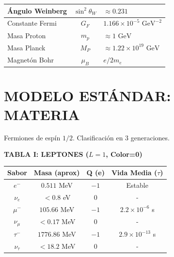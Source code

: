 \begin{center}
\begin{tabular}{|l|c|l|}
            Ángulo Weinberg      & $\sin^2\theta_W$     & $\approx 0.231$                           \\ \hline
            Constante Fermi      & $G_F$                & $1.166 \times 10^{-5} \text{ GeV}^{-2}$   \\ \hline
            Masa Proton          & $m_p$                & $\approx 1                   \text{ GeV}$ \\ \hline
            Masa Planck          & $M_P$                & $\approx 1.22 \times 10^{19} \text{ GeV}$ \\ \hline
            Magnetón Bohr        & $\mu_B$              & $e/2m_e$                                  \\ \hline
        \end{tabular}
    \end{center}

    \section{MODELO ESTÁNDAR: MATERIA}
    Fermiones de espín $1/2$. Clasificación en 3 generaciones.

    \begin{center}
        \textbf{TABLA I: LEPTONES ($L=1$, Color=0)}
        \begin{tabular}{|c|c|c|c|}
            \hline
            \textbf{Sabor} & \textbf{Masa (aprox)} & \textbf{Q (e)} & \textbf{Vida Media ($\tau$)}     \\ \hline
            $e^-$          & $0.511$ MeV           & $-1$           & Estable                 \\
            $\nu_e$        & $< 0.8$ eV            & $0$            & -                       \\ \hline
            $\mu^-$        & $105.66$ MeV          & $-1$           & $2.2 \times 10^{-6}$ s  \\
            $\nu_\mu$      & $< 0.17$ MeV          & $0$            & -                       \\ \hline
            $\tau^-$       & $1776.86$ MeV         & $-1$           & $2.9 \times 10^{-13}$ s \\
            $\nu_\tau$     & $< 18.2$ MeV          & $0$            & -                       \\ \hline
        \end{tabular}
    \end{center}

